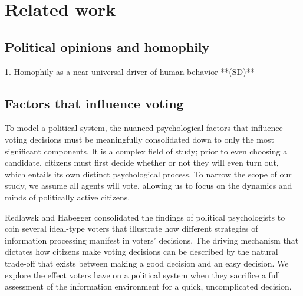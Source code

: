 \section{Related work}
\label{sec:related}

\subsection{Political opinions and homophily}
    1. Homophily as a near-universal driver of human behavior **(SD)**

\subsection{Factors that influence voting}
To model a political system, the nuanced psychological factors that influence voting decisions must be meaningfully consolidated down to only the most significant components.
It is a complex field of study; prior to even choosing a candidate, citizens must first decide whether or not they will even turn out, which entails its own distinct psychological process. To narrow the scope of our study, we assume all agents will vote, allowing us to focus on the dynamics and minds of politically active citizens.

Redlawsk 
and Habegger \cite{redlawsk_citizens_2020} consolidated the findings of political psychologists to coin 
several ideal-type voters that illustrate how different strategies of information 
processing manifest in voters’ decisions. The driving mechanism that dictates how 
citizens make voting decisions can be described by the natural trade-off that exists between making 
a good decision and an easy decision. We explore the effect voters have on a political 
system when they sacrifice a full assessment of the information environment for a 
quick, uncomplicated decision. 


